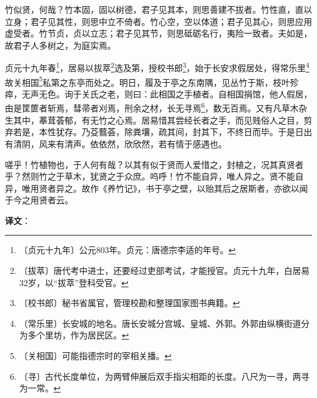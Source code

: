 \documentclass[12pt,UTF-8,openany,a4]{ctexbook}
\begin{document}
\begin{large}
    
    竹似贤，何哉？竹本固，固以树德，君子见其本，则思善建不拔者。竹性直，直以立身；君子见其性，则思中立不倚者。竹心空，空以体道；君子见其心，则思应用虚受者。竹节贞，贞以立志；君子见其节，则思砥砺名行，夷险一致者。夫如是，故君子人多树之，为庭实焉。
    
    贞元十九年春\footnote{〔贞元十九年〕\yiwen 公元803年。贞元：唐德宗李适的年号。}，居易以拔萃\footnote{〔拔萃〕\yiwen 唐代考中进士，还要经过吏部考试，才能授官。贞元十九年，白居易32岁，以“拔萃”登科受官。}选及第，授校书郎\footnote{〔校书郎〕\yiwen 秘书省属官，管理校勘和整理国家图书典籍。}，始于长安求假居处，得常乐里\footnote{〔常乐里〕\yiwen 长安城的地名。唐长安城分宫城、皇城、外郭。外郭由纵横街道分为多个里坊，作为居民区。}故关相国\footnote{〔关相国〕\yiwen 可能指德宗时的宰相关播。}私第之东亭而处之。明日，履及于亭之东南隅，见丛竹于斯，枝叶殄瘁，无声无色。询于关氏之老，则曰：此相国之手植者。自相国捐馆，他人假居，由是筐篚者斩焉，彗帚者刈焉，刑余之材，长无寻焉\footnote{〔寻〕\yiwen 古代长度单位，为两臂伸展后双手指尖相距的长度。八尺为一寻，两寻为一常。}，数无百焉。又有凡草木杂生其中，菶茸荟郁，有无竹之心焉。居易惜其尝经长者之手，而见贱俗人之目，剪弃若是，本性犹存。乃芟蘙荟，除粪壤，疏其间，封其下，不终日而毕。于是日出有清阴，风来有清声。依依然，欣欣然，若有情于感遇也。
    
    嗟乎！竹植物也，于人何有哉？以其有似于贤而人爱惜之，封植之，况其真贤者乎？然则竹之于草木，犹贤之于众庶。呜呼！竹不能自异，唯人异之。贤不能自异，唯用贤者异之。故作《养竹记》，书于亭之壁，以贻其后之居斯者，亦欲以闻于今之用贤者云。

\end{large}


\newpage

\begin{Large}
   \noindent \textbf{译文}：
\end{Large}

\vspace{1em}
\end{document}
